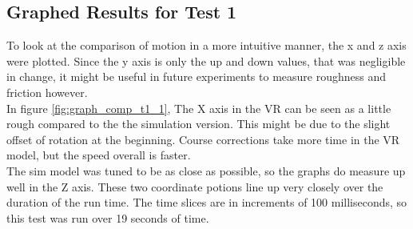 \documentclass[10pt,a4paper]{article}
\begin{document}
	\subsection*{Graphed Results for Test 1}
	To look at the comparison of motion in a more intuitive manner, the x and z axis were plotted. Since the y axis is only the up and down  values, that was negligible in change, it might be useful in future experiments to measure roughness and friction however.
	\\
	In figure \ref{fig:graph_comp_t1_1}, The X axis in the VR can be seen as a little rough compared to the the simulation version. This might be due to the slight offset of rotation at the beginning. Course corrections take more time in the VR model, but the speed overall is faster. 
	\\
	The sim model was tuned to be as close as possible, so the graphs do measure up well in the Z axis. These two coordinate potions line up very closely over the duration of the run time. The time slices are in increments of 100 milliseconds, so this test was run over 19 seconds of time.
	
\end{document}
